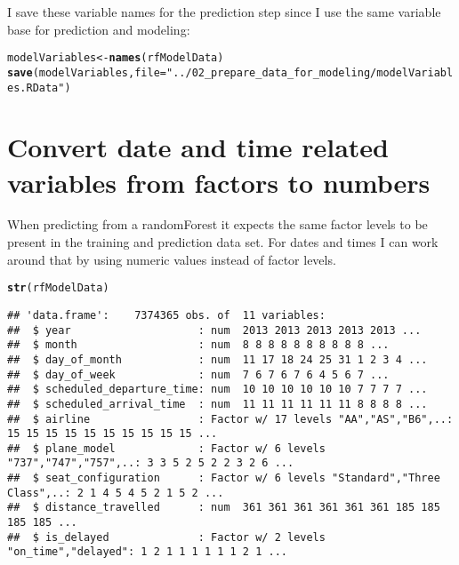 \documentclass{article}\usepackage[]{graphicx}\usepackage[]{color}
\makeatletter
\newcommand{\hlstr}[1]{\textcolor[rgb]{0.192,0.494,0.8}{#1}}%
\newcommand{\hlstd}[1]{\textcolor[rgb]{0.345,0.345,0.345}{#1}}%
\newcommand{\hlkwb}[1]{\textcolor[rgb]{0.69,0.353,0.396}{#1}}%
\newcommand{\hlkwc}[1]{\textcolor[rgb]{0.333,0.667,0.333}{#1}}%
\newcommand{\hlkwd}[1]{\textcolor[rgb]{0.737,0.353,0.396}{\textbf{#1}}}%
\newenvironment{kframe}{%
 \def\at@end@of@kframe{}%
 \ifinner\ifhmode%
  \def\at@end@of@kframe{\end{minipage}}%
  \begin{minipage}{\columnwidth}%
 \fi\fi%
 \def\FrameCommand##1{\hskip\@totalleftmargin \hskip-\fboxsep
 \colorbox{shadecolor}{##1}\hskip-\fboxsep
     \hskip-\linewidth \hskip-\@totalleftmargin \hskip\columnwidth}%
 \MakeFramed {\advance\hsize-\width
   \@totalleftmargin\z@ \linewidth\hsize
   \@setminipage}}%
 {\par\unskip\endMakeFramed%
 \at@end@of@kframe}
\newenvironment{knitrout}{}{} %
\makeatother
\begin{document}
I save these variable names for the prediction step since I use the same variable base for prediction and modeling:
\begin{knitrout}
\color{fgcolor}\begin{kframe}
\begin{alltt}
\hlstd{modelVariables} \hlkwb{<-} \hlkwd{names}\hlstd{(rfModelData)}
\hlkwd{save}\hlstd{(modelVariables,} \hlkwc{file}\hlstd{=}\hlstr{"../02_prepare_data_for_modeling/modelVariables.RData"}\hlstd{)}
\end{alltt}
\end{kframe}
\end{knitrout}

\section{Convert date and time related variables from factors to numbers}
When predicting from a randomForest it expects the same factor levels to be present in the training and prediction data set. For dates and times I can work around that by using numeric values instead of factor levels.

\begin{knitrout}
\color{fgcolor}\begin{kframe}
\begin{alltt}
\hlkwd{str}\hlstd{(rfModelData)}
\end{alltt}
\begin{verbatim}
## 'data.frame':	7374365 obs. of  11 variables:
##  $ year                    : num  2013 2013 2013 2013 2013 ...
##  $ month                   : num  8 8 8 8 8 8 8 8 8 8 ...
##  $ day_of_month            : num  11 17 18 24 25 31 1 2 3 4 ...
##  $ day_of_week             : num  7 6 7 6 7 6 4 5 6 7 ...
##  $ scheduled_departure_time: num  10 10 10 10 10 10 7 7 7 7 ...
##  $ scheduled_arrival_time  : num  11 11 11 11 11 11 8 8 8 8 ...
##  $ airline                 : Factor w/ 17 levels "AA","AS","B6",..: 15 15 15 15 15 15 15 15 15 15 ...
##  $ plane_model             : Factor w/ 6 levels "737","747","757",..: 3 3 5 2 5 2 2 3 2 6 ...
##  $ seat_configuration      : Factor w/ 6 levels "Standard","Three Class",..: 2 1 4 5 4 5 2 1 5 2 ...
##  $ distance_travelled      : num  361 361 361 361 361 361 185 185 185 185 ...
##  $ is_delayed              : Factor w/ 2 levels "on_time","delayed": 1 2 1 1 1 1 1 1 2 1 ...
\end{verbatim}
\end{kframe}
\end{knitrout}
\end{document}
